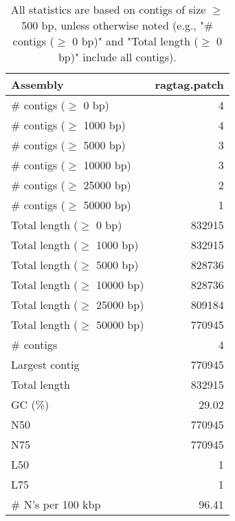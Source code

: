 \documentclass[12pt,a4paper]{article}
\begin{document}
\begin{table}[ht]
\begin{center}
\caption{All statistics are based on contigs of size $\geq$ 500 bp, unless otherwise noted (e.g., "\# contigs ($\geq$ 0 bp)" and "Total length ($\geq$ 0 bp)" include all contigs).}
\begin{tabular}{|l*{1}{|r}|}
\hline
Assembly & ragtag.patch \\ \hline
\# contigs ($\geq$ 0 bp) & 4 \\ \hline
\# contigs ($\geq$ 1000 bp) & 4 \\ \hline
\# contigs ($\geq$ 5000 bp) & 3 \\ \hline
\# contigs ($\geq$ 10000 bp) & 3 \\ \hline
\# contigs ($\geq$ 25000 bp) & 2 \\ \hline
\# contigs ($\geq$ 50000 bp) & 1 \\ \hline
Total length ($\geq$ 0 bp) & 832915 \\ \hline
Total length ($\geq$ 1000 bp) & 832915 \\ \hline
Total length ($\geq$ 5000 bp) & 828736 \\ \hline
Total length ($\geq$ 10000 bp) & 828736 \\ \hline
Total length ($\geq$ 25000 bp) & 809184 \\ \hline
Total length ($\geq$ 50000 bp) & 770945 \\ \hline
\# contigs & 4 \\ \hline
Largest contig & 770945 \\ \hline
Total length & 832915 \\ \hline
GC (\%) & 29.02 \\ \hline
N50 & 770945 \\ \hline
N75 & 770945 \\ \hline
L50 & 1 \\ \hline
L75 & 1 \\ \hline
\# N's per 100 kbp & 96.41 \\ \hline
\end{tabular}
\end{center}
\end{table}
\end{document}
